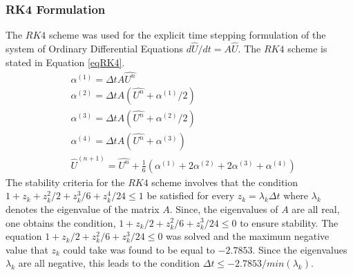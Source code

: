 \documentclass[12pt]{article}
\begin{document}
\subsubsection{RK4 Formulation}
The $RK4$ scheme was used for the explicit time stepping formulation of the system of Ordinary Differential Equations $d\hat{U}/dt = A \hat{U}$. The $RK4$ scheme is stated in Equation \ref{eqRK4}.
\begin{equation}
    \begin{aligned}
        & \alpha^{(1)} = \Delta t A \hat{U^n} \\
        & \alpha^{(2)} = \Delta t A( \hat{U^n} +  \alpha^{(1)}/2 ) \\
        & \alpha^{(3)} = \Delta t A( \hat{U^n} +  \alpha^{(2)}/2 ) \\
        & \alpha^{(4)} = \Delta t A( \hat{U^n} +  \alpha^{(3)} ) \\
        & \hat{U}^{(n + 1)} = \hat{U^n} + \frac{1}{6} \left( \alpha^{(1)} + 2\alpha^{(2)} + 2\alpha^{(3)} + \alpha^{(4)} \right)
    \end{aligned}
    \label{eqRK4}
\end{equation}
The stability criteria for the $RK4$ scheme involves that the condition $1 + z_k + z_k^2/2 + z_k^3/6 + z_k^4/24 \leq 1$ be satisfied for every $z_k = \lambda_k \Delta t$ where $\lambda_k$ denotes the eigenvalue of the matrix $A$. Since, the eigenvalues of $A$ are all real, one obtains the condition, $1 + z_k/2 + z_k^2/6 + z_k^3/24 \leq 0$ to ensure stability. The equation $1 + z_k/2 + z_k^2/6 + z_k^3/24 \leq 0$ was solved and the maximum negative value that $z_k$ could take was found to be equal to $-2.7853$. Since the eigenvalues $\lambda_k$ are all negative, this leads to the condition $\Delta t \leq -2.7853/min(\lambda_k)$.
\end{document}
